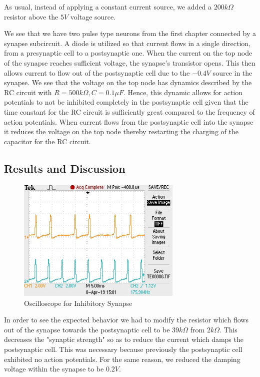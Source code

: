 \documentclass[12]{book}
\newcommand\0{\mathbf{0}}
\newcommand\<{\langle}
\renewcommand\>{\rangle}
\begin{document}
As usual, instead of applying a constant current source, we added a $200k\Omega$ resistor above the $5V$ voltage source.

We see that we have two pulse type neurons from the first chapter connected by a synapse subcircuit. A diode is utilized so that current flows in a single direction, from a presynaptic cell to a postsynaptic one. When the current on the top node of the synapse reaches sufficient voltage, the synapse's transistor opens. This then allows current to flow out of the postsynaptic cell due to the $-0.4V$ source in the synapse. We see that the voltage on the top node has dynamics described by the RC circuit with $R=500 k \Omega, C = 0.1 \mu F$. Hence, this dynamic allows for action potentials to not be inhibited completely in the postsynaptic cell given that the time constant for the RC circuit is sufficiently great compared to the frequency of action potentials. When current flows from the postsynaptic cell into the synapse it reduces the voltage on the top node thereby restarting the charging of the capacitor for the RC circuit.

\subsection{Results and Discussion}

\begin{figure}[H]
\centering
\includegraphics[width=0.7\textwidth]{inhibitory.jpg}	
\caption{Oscilloscope for Inhibitory Synapse}
\end{figure}

In order to see the expected behavior we had to modify the resistor which flows out of the synapse towards the postsynaptic cell to be $39k \Omega$ from $2k \Omega$. This decreases the "synaptic strength" so as to reduce the current which damps the postsynaptic cell. This was necessary because previously the postsynaptic cell exhibited no action potentials. For the same reason, we reduced the damping voltage within the synapse to be $0.2 V$. 
\end{document}
